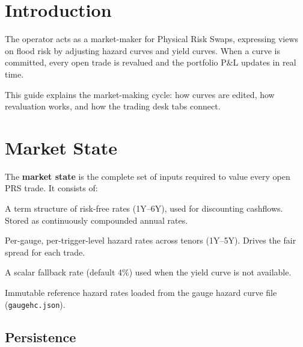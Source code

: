\documentclass[11pt,a4paper]{article}
\begin{document}
\mkmtitlepage
\mkmlegalpage

\tableofcontents
\clearpage


\section{Introduction}

The operator acts as a market-maker for Physical Risk Swaps, expressing
views on flood risk by adjusting hazard curves and yield curves.  When a
curve is committed, every open trade is revalued and the portfolio P\&L
updates in real time.

This guide explains the market-making cycle: how curves are edited, how
revaluation works, and how the trading desk tabs connect.


\section{Market State}

The \textbf{market state} is the complete set of inputs required to
value every open PRS trade.  It consists of:

\begin{description}[leftmargin=2em]
  \item[Yield Curve] A term structure of risk-free rates (1Y--6Y),
        used for discounting cashflows.  Stored as continuously
        compounded annual rates.
  \item[Hazard Term Structure] Per-gauge, per-trigger-level hazard
        rates across tenors (1Y--5Y).  Drives the fair spread for
        each trade.
  \item[Risk-Free Rate] A scalar fallback rate (default 4\%) used when
        the yield curve is not available.
  \item[Base Rates] Immutable reference hazard rates loaded from the
        gauge hazard curve file (\texttt{gaugehc.json}).
\end{description}

\subsection{Persistence}
\end{document}
